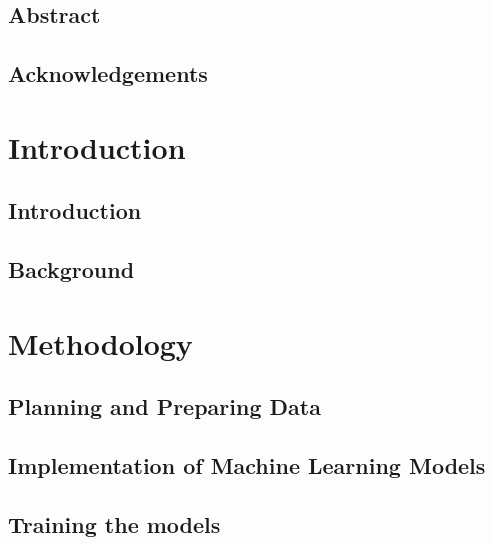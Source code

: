 \documentclass[UKenglish]{ifimaster}
\title{\problemStatement}
\subtitle{
}
\author{Joakim I. Frogner}
\begin{document}
\duoforside[dept={Department of Informatics},
program={Programming and Networks},
long]

\frontmatter{}
\chapter*{Abstract}


\chapter*{Acknowledgements}


\tableofcontents{} 
\listoffigures{}
\listoftables{}

\mainmatter{}
\part{Introduction}

\chapter{Introduction}
\label{chapter:introduction}


\chapter{Background}
\label{chapter:background}


\part{Methodology}
\chapter{Planning and Preparing Data}
\label{chapter:planning}


\chapter{Implementation of Machine Learning Models}
\label{chapter:models}


\chapter{Training the models}
\label{chapter:training}

\end{document}
